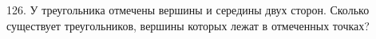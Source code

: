 126. У треугольника отмечены вершины и середины двух сторон. Сколько существует треугольников, вершины которых лежат в отмеченных точках?\\
